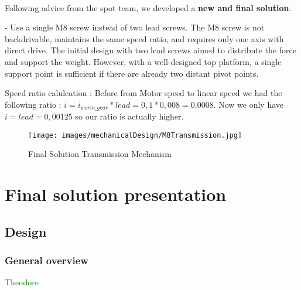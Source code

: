 \documentclass[lettersize,journal]{IEEEtran}
\begin{document}
\\  
Following advice from the spot team, we developed a \textbf{new and final solution}:

- Use a single M8 screw instead of two lead screws. The M8 screw is not backdrivable, maintains the same speed ratio, and requires only one axis with direct drive. The initial design with two lead screws aimed to distribute the force and support the weight. However, with a well-designed top platform, a single support point is sufficient if there are already two distant pivot points.

Speed ratio calulcation : Before from Motor speed to linear speed we had the following ratio : $i = i_{worm\_gear} * lead = 0,1*0,008 = 0.0008$. Now we only have $i = lead = 0,00125$ so our ratio is actually higher.


\begin{figure}[ht]
\centering
\texttt{[image: images/mechanicalDesign/M8Transmission.jpg]}
\caption{Final Solution Transmission Mechanism}
\label{finalSolTransmission}
\end{figure}





\section{Final solution presentation}


\subsection{Design}
\subsubsection{General overview } \textcolor{green}{Theodore} 


\end{document}
